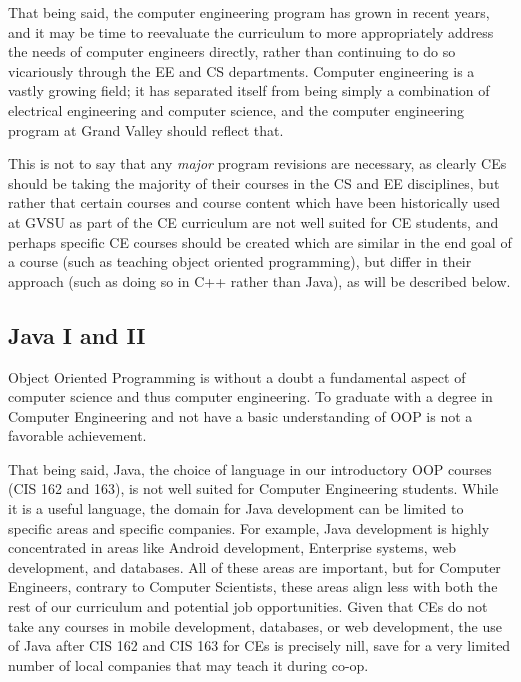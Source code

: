 \documentclass[12pt]{article}
\numberwithin{figure}{section}
\numberwithin{equation}{section}
\begin{document}
{\bigskip

That being said, the computer engineering program has grown in recent
years, and it may be time to reevaluate the curriculum to more
appropriately address the needs of computer engineers directly, rather
than continuing to do so vicariously through the EE and CS departments.
Computer engineering is a vastly growing field; it has separated itself
from being simply a combination of electrical engineering and computer
science, and the computer engineering program at Grand Valley should
reflect that.

\bigskip

This is not to say that any \emph{major} program revisions are
necessary, as clearly CEs should be taking the majority of their courses
in the CS and EE disciplines, but rather that certain courses and course
content which have been historically used at GVSU as part of the CE
curriculum are not well suited for CE students, and perhaps specific CE
courses should be created which are similar in the end goal of a course
(such as teaching object oriented programming), but differ in their
approach (such as doing so in C++ rather than Java), as will be
described below.

\subsection{Java I and II}\label{java}
Object Oriented Programming is without a doubt a fundamental aspect of
computer science and thus computer engineering. To graduate with a
degree in Computer Engineering and not have a basic understanding of OOP
is not a favorable achievement.

\bigskip

That being said, Java, the choice of language in our introductory OOP
courses (CIS 162 and 163), is not well suited for Computer Engineering
students. While it is a useful language, the domain for Java development
can be limited to specific areas and specific companies. For example,
Java development is highly concentrated in areas like Android
development, Enterprise systems, web development, and databases. All of
these areas are important, but for Computer Engineers, contrary to
Computer Scientists, these areas align less with both the rest of our
curriculum and potential job opportunities. Given that CEs do not take
any courses in mobile development, databases, or web development, the
use of Java after CIS 162 and CIS 163 for CEs is precisely nill, save
for a very limited number of local companies that may teach it during
co-op.

}
\end{document}
